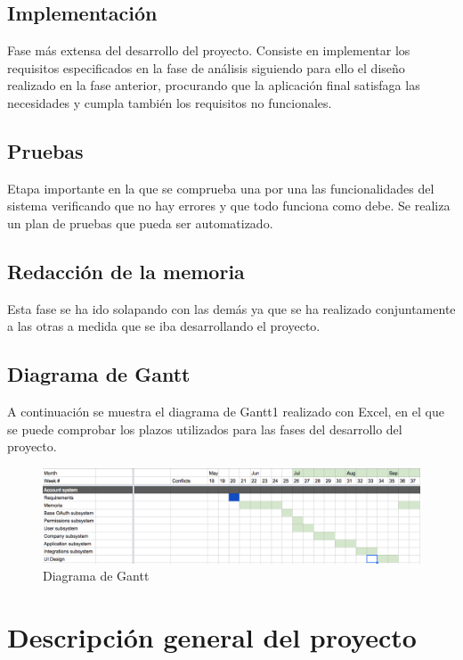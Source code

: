 \documentclass[12pt,a4paperpaper,]{report}
\begin{document}
\section{Implementación}\label{implementaciuxf3n}

Fase más extensa del desarrollo del proyecto. Consiste en implementar
los requisitos especificados en la fase de análisis siguiendo para ello
el diseño realizado en la fase anterior, procurando que la aplicación
final satisfaga las necesidades y cumpla también los requisitos no
funcionales.

\section{Pruebas}\label{pruebas}

Etapa importante en la que se comprueba una por una las funcionalidades
del sistema verificando que no hay errores y que todo funciona como
debe. Se realiza un plan de pruebas que pueda ser automatizado.

\section{Redacción de la memoria}\label{redacciuxf3n-de-la-memoria}

Esta fase se ha ido solapando con las demás ya que se ha realizado
conjuntamente a las otras a medida que se iba desarrollando el proyecto.

\section{Diagrama de Gantt}\label{diagrama-de-gantt}

A continuación se muestra el diagrama de Gantt1 realizado con Excel, en
el que se puede comprobar los plazos utilizados para las fases del
desarrollo del proyecto.

\begin{figure}
\centering
\includegraphics{source/figures/gantt.png}
\caption{Diagrama de Gantt \label{gantt}}
\end{figure}

\chapter{Descripción general del
proyecto}\label{descripciuxf3n-general-del-proyecto}
\end{document}
